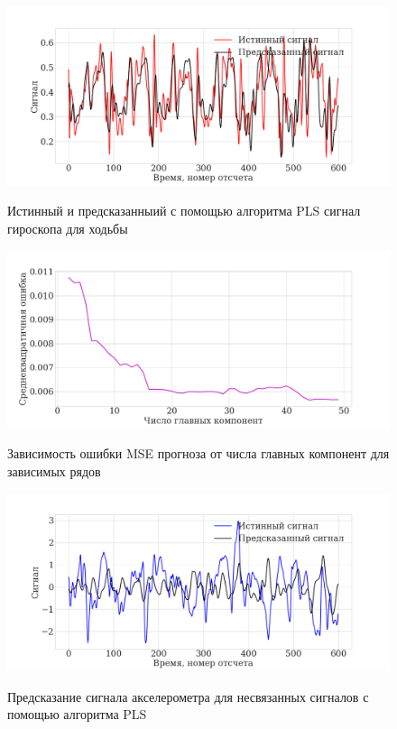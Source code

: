 \documentclass[12pt]{extarticle}
\begin{document}
\begin{figure}[h!]
\centering
{\includegraphics[width=1\textwidth]{./images/corr_new.png}}
\caption{Истинный и предсказанныий с помощью алгоритма PLS сигнал гироскопа для ходьбы}
\label{fg:pred}
\end{figure}

\begin{figure}[h!]
\centering
{\includegraphics[width=1\textwidth]{./images/ERROR_new.png}}
\caption{Зависимость ошибки MSE прогноза от числа главных компонент для зависимых рядов}
\label{fg:error_corr}
\end{figure}



\begin{figure}[h!]
\centering
{\includegraphics[width=1\textwidth]{./images/uncorr_new.png}}
\caption{Предсказание сигнала акселерометра для несвязанных сигналов с помощью алгоритма PLS}
\label{fg:uncorr}
\end{figure}
\end{document}
